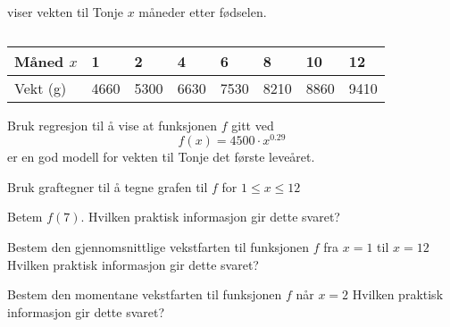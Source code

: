 \Oppgave[9]

 viser vekten til
Tonje $x$ måneder etter fødselen.

\begin{table}[H]
    \caption{}
    \label{table:Forkurs-1p-2p-laererutdanning-2017-V-oppgave-2-7}
    \begin{tabularx}{\textwidth}{|l *{7}{Y}|} \hline \Rowcolor
        Måned $x$      &      1     &      2     &      4     &      6     &      8     &      10    &      12    \\ \hline
        Vekt (\si{\g}) & \num{4660} & \num{5300} & \num{6630} & \num{7530} & \num{8210} & \num{8860} & \num{9410} \\ \hline
    \end{tabularx}
\end{table}

\begin{oppgaver}
     Bruk regresjon til å vise at funksjonen $f$ gitt ved
    \begin{equation*}
        f(x) = 4500 \cdot x^{0.29}
    \end{equation*}
    er en god modell for vekten til Tonje det første leveåret.
\end{oppgaver}

\begin{oppgaver}
   Bruk graftegner til å tegne grafen til $f$ for $1 \leq x \leq 12$
\end{oppgaver}

\begin{oppgaver}
   Betem $f(7)$. Hvilken praktisk informasjon gir dette svaret?
\end{oppgaver}

\begin{oppgaver}
   Bestem den gjennomsnittlige vekstfarten til funksjonen $f$ fra $x =
    1$ til $x = 12$ Hvilken praktisk informasjon gir dette svaret?
\end{oppgaver}

\begin{oppgaver}
   Bestem den momentane vekstfarten til funksjonen $f$ når $x=2$
    Hvilken praktisk informasjon gir dette svaret?
\end{oppgaver}


